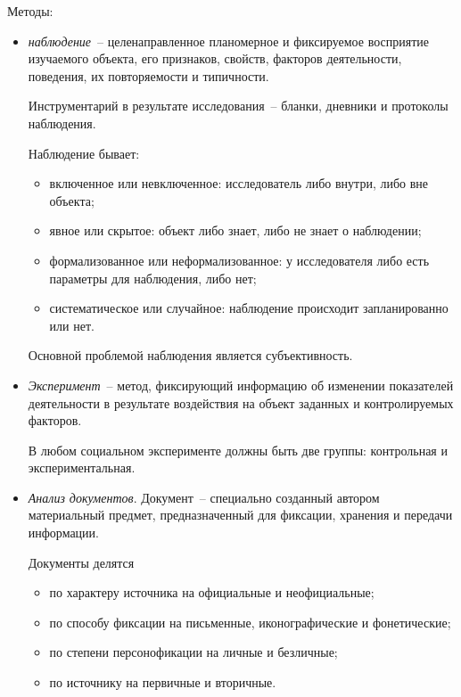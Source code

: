     Методы:
    \begin{itemize}
      \item \emph{наблюдение}~-- целенаправленное планомерное и фиксируемое
        восприятие изучаемого объекта, его признаков, свойств, факторов
        деятельности, поведения, их повторяемости и типичности.

        Инструментарий в результате исследования~-- бланки, дневники и протоколы
        наблюдения.

        Наблюдение бывает:
        \begin{itemize}
          \item включенное или невключенное: исследователь либо внутри, либо
            вне объекта;
          \item явное или скрытое: объект либо знает, либо не знает о
            наблюдении;
          \item формализованное или неформализованное: у исследователя либо
            есть параметры для наблюдения, либо нет;
          \item систематическое или случайное: наблюдение происходит
            запланированно или нет.
        \end{itemize}

        Основной проблемой наблюдения является субъективность.

      \item \emph{Эксперимент}~-- метод, фиксирующий информацию об изменении
        показателей деятельности в результате воздействия на объект заданных и
        контролируемых факторов.

        В любом социальном эксперименте должны быть две группы: контрольная и
        экспериментальная.

      \item \emph{Анализ документов}. Документ~-- специально созданный автором
        материальный предмет, предназначенный для фиксации, хранения и передачи
        информации.

        Документы делятся
        \begin{itemize}
          \item по характеру источника на официальные и неофициальные;
          \item по способу фиксации на письменные, иконографические и
            фонетические;
          \item по степени персонофикации на личные и безличные;
          \item по источнику на первичные и вторичные.
        \end{itemize}


\end{itemize}
